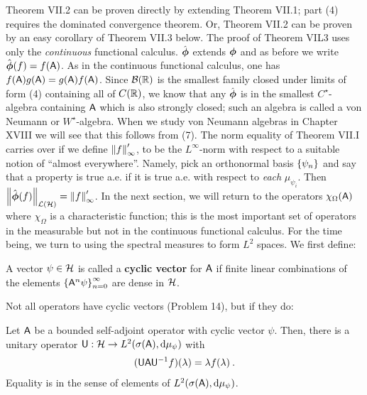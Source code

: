 Theorem VII.2 can be proven directly by extending Theorem VII.1; part (4) requires the dominated convergence theorem. Or, Theorem VII.2 can be proven by an easy corollary of Theorem VII.3 below. The proof of Theorem VIL3 uses only the \textit{continuous} functional calculus. $\hat {\boldsymbol{\phi}}$ extends $\boldsymbol{\phi}$ and as before we write $\hat {\boldsymbol{\phi}} (f) = f(\mathsf{A})$. As in the continuous functional calculus, one has $f(\mathsf{A}) g(\mathsf{A}) = g(\mathsf{A}) f(\mathsf{A})$.
Since $\mathcal B (\mathbb{R})$ is the smallest family closed under limits of form (4) containing all of $C(\mathbb{R})$, we know that any $\hat {\boldsymbol{\phi}}$ is in the smallest $C^\star$-algebra containing $\mathsf{A}$ which is also strongly closed; such an algebra is called a von Neumann or $W^\star$-algebra. When we study von Neumann algebras in Chapter XVIII we will see that this follows from (7).
The norm equality of Theorem VII.I carries over if we define $\left \Vert f \right \Vert_\infty '$, to be the $L^\infty$-norm with respect to a suitable notion of \enquote{almost everywhere}. Namely, pick an orthonormal basis $\left \lbrace \psi_n \right \rbrace$ and say that a property is true a.e. if it is true a.e. with respect to \textit{each} $\mu_{\psi_i}$. Then $\left \Vert  \hat {\boldsymbol{\phi}} (f) \right \Vert_{\mathcal L(\mathcal{H})} =\left \Vert f \right \Vert_\infty '$.
In the next section, we will return to the operators $\chi_\Omega (\mathsf{A})$ where $\chi_\Omega$ is a characteristic function; this is the most important set of operators in the measurable but not in the continuous functional calculus. For the time being, we turn to using the spectral measures to form $L^2$ spaces. We first define:

\begin{definition}
    A vector $\psi \in \mathcal{H}$ is called a \textbf{cyclic vector} for $\mathsf{A}$ if finite linear combinations of the elements $\left \lbrace \mathsf{A}^n \psi \right \rbrace_{n=0}^\infty$ are dense in $\mathcal{H}$.
\end{definition}

Not all operators have cyclic vectors (Problem 14), but if they do:

\begin{lemma}
    Let $\mathsf{A}$ be a bounded self-adjoint operator with cyclic vector $\psi$. Then, there is a unitary operator $\mathsf{U}: \mathcal{H} \to L^{2}(\sigma(\mathsf{A}), \mathrm{d} \mu_\psi)$ with \begin{align}
        (\mathsf{U} \mathsf{A} \mathsf{U}^{-1} f) (\lambda) = \lambda f(\lambda) \:.
    \end{align}
    Equality is in the sense of elements of $L^{2}(\sigma(\mathsf{A}), \mathrm{d} \mu_\psi)$.
\end{lemma}

